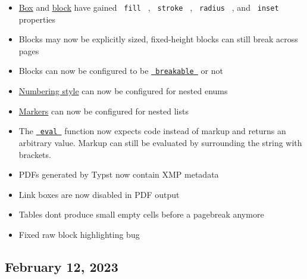 \begin{itemize}
\tightlist
\item
  \href{/docs/reference/layout/box/}{Box} and
  \href{/docs/reference/layout/block/}{block} have gained
  \texttt{\ fill\ } , \texttt{\ stroke\ } , \texttt{\ radius\ } , and
  \texttt{\ inset\ } properties
\item
  Blocks may now be explicitly sized, fixed-height blocks can still
  break across pages
\item
  Blocks can now be configured to be
  \href{/docs/reference/layout/block/\#parameters-breakable}{\texttt{\ breakable\ }}
  or not
\item
  \href{/docs/reference/model/enum/\#parameters-numbering}{Numbering
  style} can now be configured for nested enums
\item
  \href{/docs/reference/model/list/\#parameters-marker}{Markers} can now
  be configured for nested lists
\item
  The \href{/docs/reference/foundations/eval/}{\texttt{\ eval\ }}
  function now expects code instead of markup and returns an arbitrary
  value. Markup can still be evaluated by surrounding the string with
  brackets.
\item
  PDFs generated by Typst now contain XMP metadata
\item
  Link boxes are now disabled in PDF output
\item
  Tables don\textquotesingle t produce small empty cells before a
  pagebreak anymore
\item
  Fixed raw block highlighting bug
\end{itemize}

\subsection{February 12, 2023}\label{february-12-2023}

